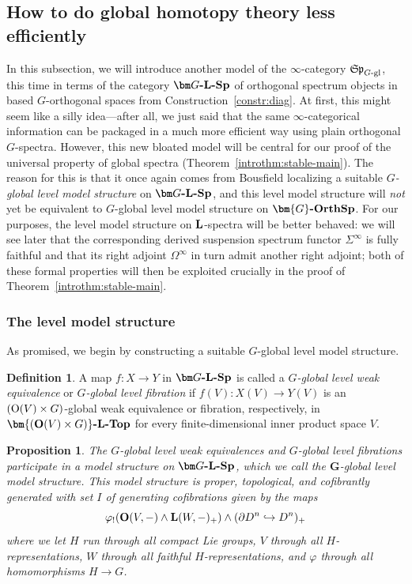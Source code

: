 \documentclass[reqno]{memo-l}
\theoremstyle{mythm}
\newtheorem{prop}[thm]{Proposition}
\theoremstyle{definition}
\newtheorem{definition}[thm]{Definition}
\numberwithin{equation}{section}
\renewcommand{\phi}{\varphi}
\newcommand{\cat}[1]{\textbf{\textup{#1}}}
\renewcommand{\O}{{\textup{O}}}
\let\smashp=\wedge
\newcommand{\mySp}{{\mathfrak S\kern-.5pt\mathfrak p}}
\newcommand{\Gosp}[1]{\cat{$\bm{#1}$-OrthSp}}
\begin{document}
\subsection{How to do global homotopy theory less efficiently}\label{subsec:L-spectra}
In this subsection, we will introduce another model of the $\infty$-category $\mySp_\text{$G$-gl}$, this time in terms of the category $\cat{$\bm G$-$\cat{L}$-Sp}$ of orthogonal spectrum objects in based $G$-orthogonal spaces from Construction~\ref{constr:diag}. At first, this might seem like a silly idea---after all, we just said that the same $\infty$-categorical information can be packaged in a much more efficient way using plain orthogonal $G$-spectra. However, this new bloated model will be central for our proof of the universal property of global spectra (Theorem~\ref{introthm:stable-main}). The reason for this is that it once again comes from Bousfield localizing a suitable \emph{$G$-global level model structure} on $\cat{$\bm G$-$\cat{L}$-Sp}$, and this level model structure will \emph{not} yet be equivalent to $G$-global level model structure on $\Gosp{G}$. For our purposes, the level model structure on $\cat L$-spectra will be better behaved: we will see later that the corresponding derived suspension spectrum functor $\Sigma^\infty$ is fully faithful and that its right adjoint $\Omega^\infty$ in turn admit another right adjoint; both of these formal properties will then be exploited crucially in the proof of Theorem~\ref{introthm:stable-main}.

\medskip
\subsubsection{The level model structure} As promised, we begin by constructing a suitable $G$-global level model structure.

\begin{definition}
    A map $f\colon X\to Y$ in $\cat{$\bm G$-$\cat{L}$-Sp}$ is called a \emph{$G$-global level weak equivalence} or \emph{$G$-global level fibration} if $f(V)\colon X(V)\to Y(V)$ is an $(\O(V)\times G)$-global weak equivalence or fibration, respectively, in $\cat{$\bm{(\O(V)\times G)}$-$\cat{L}$-Top}$ for every finite-dimensional inner product space $V$.
\end{definition}

\begin{prop}\label{prop:LSp-lvl}
    The $G$-global level weak equivalences and $G$-global level fibrations participate in a model structure on $\cat{$\bm G$-$\cat{L}$-Sp}$, which we call the \emph{$\bm G$-global level model structure}. This model structure is proper, topological, and cofibrantly generated with set $I$ of generating cofibrations given by the maps
    \[
        \phi_!(\cat{O}(V,-)\smashp\cat{L}(W,-)_+)\smashp(\partial D^n\hookrightarrow D^n)_+
    \]
    where we let $H$ run through all compact Lie groups, $V$ through all $H$-representations, $W$ through all \emph{faithful} $H$-representations, and $\phi$ through all homomorphisms $H\to G$.
\end{prop}
\end{document}
